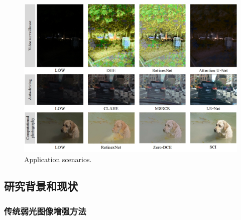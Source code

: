 \documentclass[CJK,aspectratio=169]{beamer}  %
\begin{document}
\begin{frame}
\begin{figure}
\begin{minipage}{.4\columnwidth}
\begin{itemize}
				\end{itemize}
			\end{minipage}
			\begin{minipage}{.55\columnwidth}
				\setlength{\abovecaptionskip}{-0.05cm}
				\centering
				\includegraphics[width=\linewidth]{picture/LLIE/application scenarios}
				\caption{
					\label{fig: application scenarios}
					\tiny Application scenarios.
				}
			\end{minipage}
		\end{figure}
	\end{frame}
	
	\subsection{研究背景和现状}
	
	\subsubsection{传统弱光图像增强方法}
	
\end{document}
